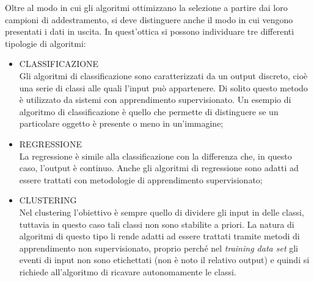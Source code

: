 Oltre al modo in cui gli algoritmi ottimizzano la selezione a partire dai loro campioni di addestramento, si deve distinguere anche il modo in cui vengono presentati i dati in uscita. In quest'ottica si possono individuare tre differenti tipologie di algoritmi:
\begin{itemize}
	
	\item CLASSIFICAZIONE \\
	Gli algoritmi di classificazione sono caratterizzati da un output discreto, cioè una serie di classi alle quali l'input può appartenere. Di solito questo metodo è utilizzato da sistemi con apprendimento supervisionato. Un esempio di algoritmo di classificazione è quello che permette di distinguere se un particolare oggetto è presente o meno in un'immagine;
	
	\item REGRESSIONE \\
	La regressione è simile alla classificazione con la differenza che, in questo caso, l'output è continuo. Anche gli algoritmi di regressione sono adatti ad essere trattati con metodologie di apprendimento supervisionato;
	
	\item CLUSTERING \\
	Nel clustering l'obiettivo è sempre quello di dividere gli input in delle classi, tuttavia in questo caso tali classi non sono stabilite a priori. La natura di algoritmi di questo tipo li rende adatti ad essere trattati tramite metodi di apprendimento non supervisionato, proprio perché nel \textit{training data set} gli eventi di input non sono etichettati (non è noto il relativo output) e quindi si richiede all'algoritmo di ricavare autonomamente le classi.
	
\end{itemize}


